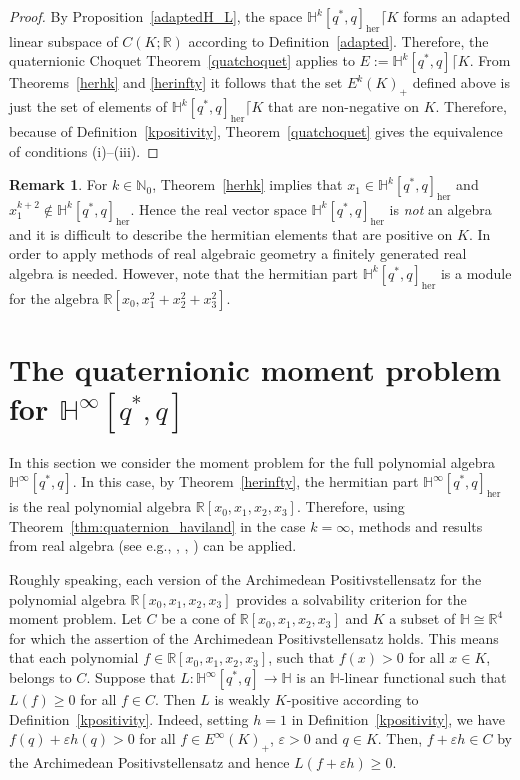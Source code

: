 \documentclass[11pt,a4paper]{amsart}
\theoremstyle{definition}
\newtheorem{remark}[theorem]{Remark}
\begin{document}
\begin{proof}
By Proposition~\ref{adaptedH_L}, the space
${\mathbb{H}^{k}[q^{*},q]_{\mathrm{her}}\lceil K}$ forms an adapted linear
subspace of $C(K; \mathbb{R})$ according to Definition~\ref{adapted}. Therefore,
the quaternionic Choquet Theorem~\ref{quatchoquet} applies to
$E:=\mathbb{H}^{k}[q^{*}, q] \lceil K$. From Theorems~\ref{herhk} and \ref{herinfty} it follows that the set $E^{k}(K)_{+}$ defined above is
just the set of elements of
${\mathbb{H}^{k}[q^{*},q]_{\mathrm{her}}\lceil K}$ that are non-negative
on $K$. Therefore, because of Definition~\ref{kpositivity}, Theorem~\ref{quatchoquet} gives the equivalence of conditions (i)--(iii).
\end{proof}%
%
\begin{remark}
\label{rem6.3}
For $k\in \mathbb{N}_{0}$, Theorem~\ref{herhk} implies that
$x_{1}\in \mathbb{H}^{k}[q^{*}, q]_{\mathrm{her}}$ and
$x_{1}^{k+2}\notin \mathbb{H}^{k}[q^{*}, q]_{\mathrm{her}}$. Hence the
real vector space $ \mathbb{H}^{k}[q^{*}, q]_{\mathrm{her}}$ is \textit{not}
an algebra and it is difficult to describe the hermitian elements that
are positive on $K$. In order to apply methods of real algebraic geometry
a finitely generated real algebra is needed. However, note that the hermitian
part $ \mathbb{H}^{k}[q^{*}, q]_{\mathrm{her}}$ is a module for the algebra
$\mathbb{R}[x_{0},x_{1}^{2}+x_{2}^{2}+x_{3}^{2}]$.
\end{remark}

\section{The quaternionic moment problem for $ \mathbb{H}^{\infty}[q^{*}, q]$}
\label{mpinfty}

In this section we consider the moment problem for the full polynomial
algebra $ \mathbb{H}^{\infty}[q^{*}, q]$. In this case, by Theorem~\ref{herinfty}, the hermitian part
$\mathbb{H}^{\infty}[q^{*},q]_{\mathrm{her}}$ is the real polynomial algebra
$\mathbb{R}[x_{0},x_{1}, x_{2},x_{3}]$. Therefore, using Theorem~\ref{thm:quaternion_haviland} in the case $k=\infty $, methods and results
from real algebra (see e.g., \cite{Marshall2008},
\cite{Scheiderer2024}, \cite[Chapter 12]{Schmudgen2017}) can be applied.

Roughly speaking, each version of the Archimedean Positivstellensatz for
the polynomial algebra $\mathbb{R}[x_{0},x_{1},x_{2},x_{3}]$ provides a
solvability criterion for the moment problem. Let $C$ be a cone of
$\mathbb{R}[x_{0},x_{1},x_{2},x_{3}]$ and $K$ a subset of
$\mathbb{H}\cong \mathbb{R}^{4}$ for which the assertion of the Archimedean
Positivstellensatz holds. This means that each polynomial
$f \in \mathbb{R}[x_{0},x_{1},x_{2},x_{3}]$, such that $f(x)>0$ for all
$x\in K$, belongs to $C$. Suppose that
$L:\mathbb{H}^{\infty}[q^{*}, q]\to \mathbb{H}$ is an $\mathbb{H}$-linear
functional such that $L(f)\geq 0$ for all $f\in C$. Then $L$ is weakly
$K$-positive according to Definition~\ref{kpositivity}. Indeed, setting
$h=1$ in Definition~\ref{kpositivity}, we have
$f(q)+\varepsilon h(q)>0$ for all $f\in E^{\infty}(K)_{+}$,
$\varepsilon >0$ and $q\in K$. Then, $f+\varepsilon h\in C$ by the Archimedean
Positivstellensatz and hence $L(f+\varepsilon h)\geq 0$.
\end{document}
